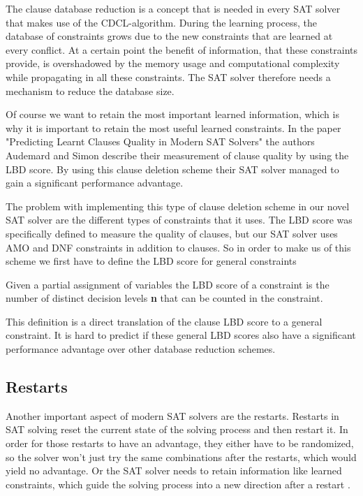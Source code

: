 The clause database reduction is a concept that is needed in every SAT solver that makes use of the CDCL-algorithm. During the learning process, the database of constraints grows due to the new constraints that are learned at every conflict. At a certain point the benefit of information, that these constraints provide, is overshadowed by the memory usage and computational complexity while propagating in all these constraints. The SAT solver therefore needs a mechanism to reduce the database size.

Of course we want to retain the most important learned information, which is why it is important to retain the most useful learned constraints. In the paper "Predicting Learnt Clauses Quality in Modern SAT Solvers" \cite{audemard2009predicting} the authors Audemard and Simon describe their measurement of clause quality by using the LBD score. By using this clause deletion scheme their SAT solver managed to gain a significant performance advantage.

The problem with implementing this type of clause deletion scheme in our novel SAT solver are the different types of constraints that it uses. The LBD score was specifically defined to measure the quality of clauses, but our SAT solver uses AMO and DNF constraints in addition to clauses. So in order to make us of this scheme we first have to define the LBD score for general constraints

\begin{leftbar}
Given a partial assignment of variables the LBD score of a constraint is the number of distinct decision levels \textbf{n} that can be counted in the constraint.
\end{leftbar}

This definition is a direct translation of the clause LBD score to a general constraint. It is hard to predict if these general LBD scores also have a significant performance advantage over other database reduction schemes.

\subsection{Restarts}

Another important aspect of modern SAT solvers are the restarts. Restarts in SAT solving reset the current state of the solving process and then restart it. In order for those restarts to have an advantage, they either have to be randomized, so the solver won't just try the same combinations after the restarts, which would yield no advantage. Or the SAT solver needs to retain information like learned constraints, which guide the solving process into a new direction after a restart \cite{biere2009handbook}.

